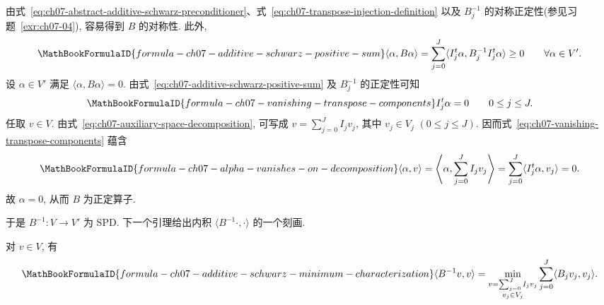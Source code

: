 \begin{Proof}
由式~\eqref{eq:ch07-abstract-additive-schwarz-preconditioner}、式~\eqref{eq:ch07-transpose-injection-definition} 以及 $B_j^{-1}$ 的对称正定性(参见习题~\ref{exr:ch07-04}), 容易得到 $B$ 的对称性. 此外,
\begin{equation}
\MathBookFormulaID{formula-ch07-additive-schwarz-positive-sum}
\label{eq:ch07-additive-schwarz-positive-sum}
\langle\alpha,B\alpha\rangle
=\sum_{j=0}^{J}\langle I_j^t\alpha,B_j^{-1}I_j^t\alpha\rangle
\geq0
\qquad\forall\alpha\in V'.
\end{equation}
设 $\alpha\in V'$ 满足 $\langle\alpha,B\alpha\rangle=0$. 由式~\eqref{eq:ch07-additive-schwarz-positive-sum} 及 $B_j^{-1}$ 的正定性可知
\begin{equation}
\MathBookFormulaID{formula-ch07-vanishing-transpose-components}
\label{eq:ch07-vanishing-transpose-components}
I_j^t\alpha=0
\qquad 0\leq j\leq J.
\end{equation}
任取 $v\in V$. 由式~\eqref{eq:ch07-auxiliary-space-decomposition}, 可写成 $v=\sum_{j=0}^{J}I_jv_j$, 其中 $v_j\in V_j$ $(0\leq j\leq J)$. 因而式~\eqref{eq:ch07-vanishing-transpose-components} 蕴含
\[
\MathBookFormulaID{formula-ch07-alpha-vanishes-on-decomposition}
\langle\alpha,v\rangle
=\left\langle\alpha,\sum_{j=0}^{J}I_jv_j\right\rangle
=\sum_{j=0}^{J}\langle I_j^t\alpha,v_j\rangle=0.
\]
故 $\alpha=0$, 从而 $B$ 为正定算子.
\end{Proof}

于是 $B^{-1}:V\longrightarrow V'$ 为 SPD. 下一个引理给出内积 $\langle B^{-1}\cdot,\cdot\rangle$ 的一个刻画.

\begin{Lemma}
\label{lem:ch07-additive-schwarz-minimum-characterization}
对 $v\in V$, 有
\begin{equation}
\MathBookFormulaID{formula-ch07-additive-schwarz-minimum-characterization}
\label{eq:ch07-additive-schwarz-minimum-characterization}
\langle B^{-1}v,v\rangle
=\min_{\substack{v=\sum_{j=0}^{J}I_jv_j\\v_j\in V_j}}
\sum_{j=0}^{J}\langle B_jv_j,v_j\rangle.
\end{equation}
\end{Lemma}

